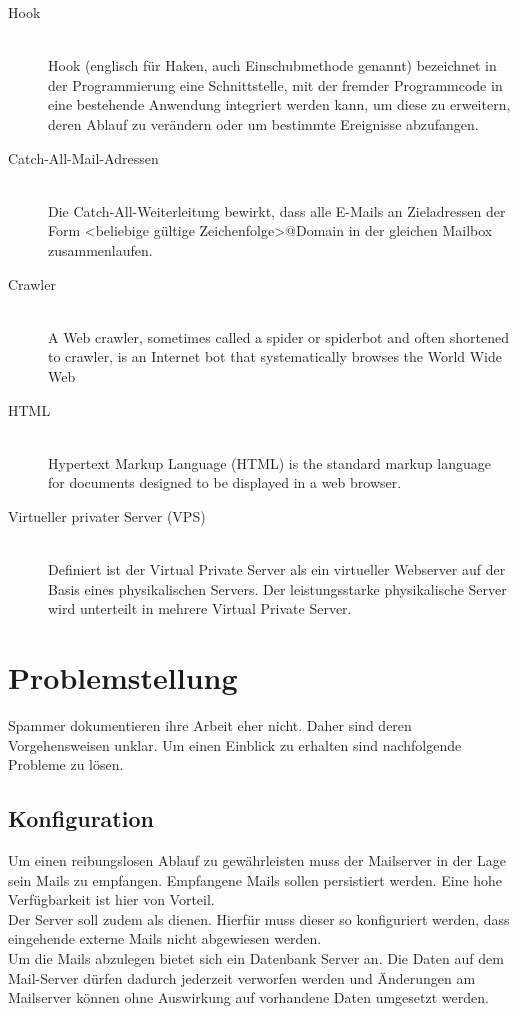 \documentclass[a4paper,11pt,singlespacing]{article}
\begin{document}
\begin{description}
	\item[Hook\label{itm:Hook}]\hfill \\
		Hook (englisch für Haken, auch Einschubmethode genannt) bezeichnet in der Programmierung eine Schnittstelle, mit der fremder Programmcode in eine bestehende Anwendung integriert werden kann, um diese zu erweitern, deren Ablauf zu verändern oder um bestimmte Ereignisse abzufangen.\cite{Hook}
	\item[Catch-All-Mail-Adressen\label{itm:Catch-All-Mail}]\hfill \\
		Die Catch-All-Weiterleitung bewirkt, dass alle E-Mails an Zieladressen der Form <beliebige gültige Zeichenfolge>@Domain in der gleichen Mailbox zusammenlaufen.\cite{Catch-All-Mail}
	\item[Crawler\label{itm:crawler}]\hfill \\
		A Web crawler, sometimes called a spider or spiderbot and often shortened to crawler, is an Internet bot that systematically browses the World Wide Web \cite{crawler}
	\item[HTML\label{itm:HTML}]\hfill \\
		Hypertext Markup Language (HTML) is the standard markup language for documents designed to be displayed in a web browser.\cite{HTML}
	\item[Virtueller privater Server (VPS)\label{itm:VPS}]\hfill \\
        	Definiert ist der Virtual Private Server als ein virtueller Webserver auf der Basis eines physikalischen Servers.
		Der leistungsstarke physikalische Server wird unterteilt in mehrere Virtual Private Server.\cite{VPS}
	\end{description}

\newpage


\section{Problemstellung}\label{sec:Problemstellung}
	Spammer dokumentieren ihre Arbeit eher nicht.
	Daher sind deren Vorgehensweisen unklar.
	Um einen Einblick zu erhalten sind nachfolgende Probleme zu lösen.

	\subsection{Konfiguration}\label{sec:ProblemstellungKonfiguration}
		Um einen reibungslosen Ablauf zu gewährleisten muss der Mailserver in der Lage sein Mails zu empfangen.
		Empfangene Mails sollen persistiert werden.
		Eine hohe Verfügbarkeit ist hier von Vorteil.
		\\
		Der Server soll zudem als  dienen.
		Hierfür muss dieser so konfiguriert werden, dass eingehende externe Mails nicht abgewiesen werden.
		\\
		Um die Mails abzulegen bietet sich ein Datenbank Server an.
		Die Daten auf dem Mail-Server dürfen dadurch jederzeit verworfen werden und Änderungen am Mailserver können ohne Auswirkung auf vorhandene Daten umgesetzt werden.
\end{document}
